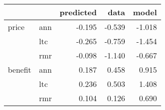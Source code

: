 \begin{tabular}{llrrr}
\toprule
        &     &  predicted &   data &  model \\
\midrule
price & ann &     -0.195 & -0.539 & -1.018 \\
        & ltc &     -0.265 & -0.759 & -1.454 \\
        & rmr &     -0.098 & -1.140 & -0.667 \\
benefit & ann &      0.187 &  0.458 &  0.915 \\
        & ltc &      0.236 &  0.503 &  1.408 \\
        & rmr &      0.104 &  0.126 &  0.690 \\
\bottomrule
\end{tabular}
